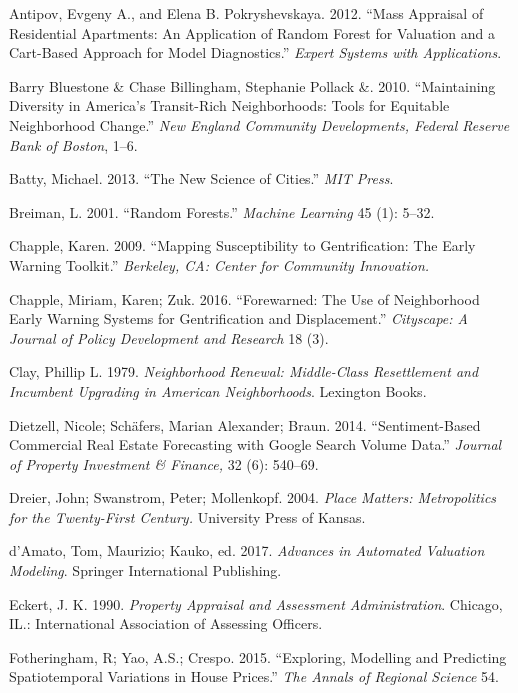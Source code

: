 \documentclass[]{article}
\begin{document}
\hypertarget{ref-antipov12}{}
Antipov, Evgeny A., and Elena B. Pokryshevskaya. 2012. ``Mass Appraisal
of Residential Apartments: An Application of Random Forest for Valuation
and a Cart-Based Approach for Model Diagnostics.'' \emph{Expert Systems
with Applications}.

\hypertarget{ref-Pollack2010}{}
Barry Bluestone \& Chase Billingham, Stephanie Pollack \&. 2010.
``Maintaining Diversity in America's Transit-Rich Neighborhoods: Tools
for Equitable Neighborhood Change.'' \emph{New England Community
Developments, Federal Reserve Bank of Boston}, 1--6.

\hypertarget{ref-Batty2013}{}
Batty, Michael. 2013. ``The New Science of Cities.'' \emph{MIT Press}.

\hypertarget{ref-Breiman2001}{}
Breiman, L. 2001. ``Random Forests.'' \emph{Machine Learning} 45 (1):
5--32.

\hypertarget{ref-Chapple2009}{}
Chapple, Karen. 2009. ``Mapping Susceptibility to Gentrification: The
Early Warning Toolkit.'' \emph{Berkeley, CA: Center for Community
Innovation.}

\hypertarget{ref-Chapple2016}{}
Chapple, Miriam, Karen; Zuk. 2016. ``Forewarned: The Use of Neighborhood
Early Warning Systems for Gentrification and Displacement.''
\emph{Cityscape: A Journal of Policy Development and Research} 18 (3).

\hypertarget{ref-Clay1979}{}
Clay, Phillip L. 1979. \emph{Neighborhood Renewal: Middle-Class
Resettlement and Incumbent Upgrading in American Neighborhoods}.
Lexington Books.

\hypertarget{ref-Dietzell2014}{}
Dietzell, Nicole; Schäfers, Marian Alexander; Braun. 2014.
``Sentiment-Based Commercial Real Estate Forecasting with Google Search
Volume Data.'' \emph{Journal of Property Investment \& Finance,} 32 (6):
540--69.

\hypertarget{ref-Dreier2004}{}
Dreier, John; Swanstrom, Peter; Mollenkopf. 2004. \emph{Place Matters:
Metropolitics for the Twenty-First Century.} University Press of Kansas.

\hypertarget{ref-Springer2017}{}
d'Amato, Tom, Maurizio; Kauko, ed. 2017. \emph{Advances in Automated
Valuation Modeling}. Springer International Publishing.

\hypertarget{ref-Eckert1990}{}
Eckert, J. K. 1990. \emph{Property Appraisal and Assessment
Administration}. Chicago, IL.: International Association of Assessing
Officers.

\hypertarget{ref-Fotheringham2015}{}
Fotheringham, R; Yao, A.S.; Crespo. 2015. ``Exploring, Modelling and
Predicting Spatiotemporal Variations in House Prices.'' \emph{The Annals
of Regional Science} 54.
\end{document}

